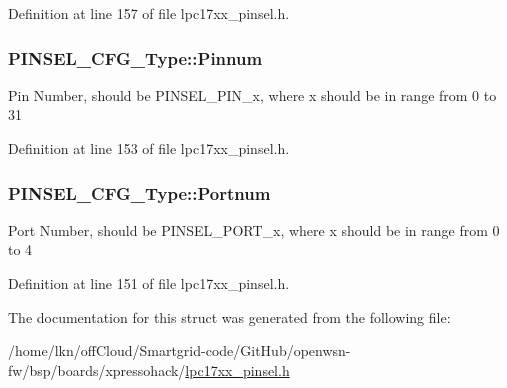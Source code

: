 Definition at line 157 of file lpc17xx\+\_\+pinsel.\+h.

\subsubsection[{\texorpdfstring{Pinnum}{Pinnum}}]{ P\+I\+N\+S\+E\+L\+\_\+\+C\+F\+G\+\_\+\+Type\+::\+Pinnum}\hypertarget{struct_p_i_n_s_e_l___c_f_g___type_a6d439a871adb445a571aa28806593532}{}\label{struct_p_i_n_s_e_l___c_f_g___type_a6d439a871adb445a571aa28806593532}
Pin Number, should be P\+I\+N\+S\+E\+L\+\_\+\+P\+I\+N\+\_\+x, where x should be in range from 0 to 31 

Definition at line 153 of file lpc17xx\+\_\+pinsel.\+h.

\subsubsection[{\texorpdfstring{Portnum}{Portnum}}]{ P\+I\+N\+S\+E\+L\+\_\+\+C\+F\+G\+\_\+\+Type\+::\+Portnum}\hypertarget{struct_p_i_n_s_e_l___c_f_g___type_a6b754912548dadd6634bb39c8b760fd1}{}\label{struct_p_i_n_s_e_l___c_f_g___type_a6b754912548dadd6634bb39c8b760fd1}
Port Number, should be P\+I\+N\+S\+E\+L\+\_\+\+P\+O\+R\+T\+\_\+x, where x should be in range from 0 to 4 

Definition at line 151 of file lpc17xx\+\_\+pinsel.\+h.



The documentation for this struct was generated from the following file\+:\begin{DoxyCompactItemize}
\item 
/home/lkn/off\+Cloud/\+Smartgrid-\/code/\+Git\+Hub/openwsn-\/fw/bsp/boards/xpressohack/\hyperlink{lpc17xx__pinsel_8h}{lpc17xx\+\_\+pinsel.\+h}\end{DoxyCompactItemize}
